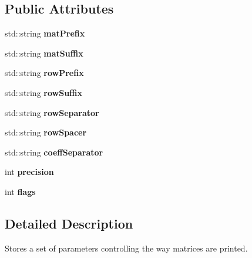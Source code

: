 \subsection*{Public Attributes}
\begin{DoxyCompactItemize}
\item 
\mbox{\label{struct_eigen_1_1_i_o_format_a84ef75e032b1d786d7bae864c3111a94}} 
std\+::string {\bfseries mat\+Prefix}
\item 
\mbox{\label{struct_eigen_1_1_i_o_format_abd7f0810c3f1413a018cd359c4ec384b}} 
std\+::string {\bfseries mat\+Suffix}
\item 
\mbox{\label{struct_eigen_1_1_i_o_format_a11bc5e80cae36f1e41b0ba88492af29e}} 
std\+::string {\bfseries row\+Prefix}
\item 
\mbox{\label{struct_eigen_1_1_i_o_format_a19e1e23bef7438cecd645addcdc46c79}} 
std\+::string {\bfseries row\+Suffix}
\item 
\mbox{\label{struct_eigen_1_1_i_o_format_aa97a2793595db0f308ad001d7c3d5042}} 
std\+::string {\bfseries row\+Separator}
\item 
\mbox{\label{struct_eigen_1_1_i_o_format_a601b70608ea9f7e6b4ab0d9a408e4a1e}} 
std\+::string {\bfseries row\+Spacer}
\item 
\mbox{\label{struct_eigen_1_1_i_o_format_a1f6e33703af4fda7acd46c79a0e36656}} 
std\+::string {\bfseries coeff\+Separator}
\item 
\mbox{\label{struct_eigen_1_1_i_o_format_aca5261bbbae1f8e74994f8a2cb8b2159}} 
int {\bfseries precision}
\item 
\mbox{\label{struct_eigen_1_1_i_o_format_af77fcb773114c83667553cb87fbb6748}} 
int {\bfseries flags}
\end{DoxyCompactItemize}


\subsection{Detailed Description}
Stores a set of parameters controlling the way matrices are printed. 

